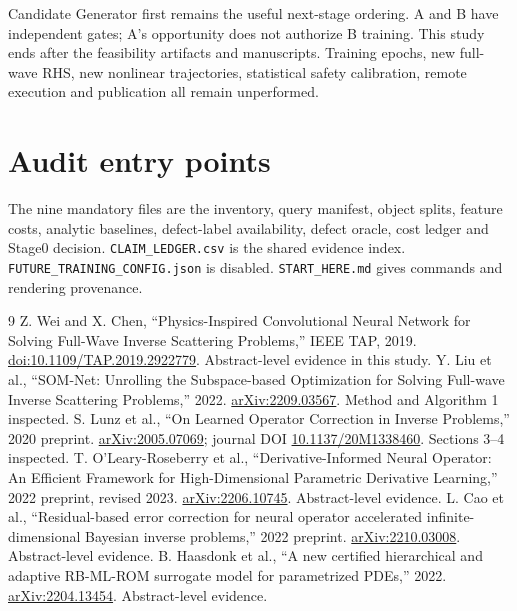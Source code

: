 \documentclass[11pt,a4paper]{article}
\newcommand{\code}[1]{\texttt{#1}}
\begin{document}
Candidate Generator first remains the useful next-stage ordering. A and B have independent gates; A's opportunity does not authorize B training. This study ends after the feasibility artifacts and manuscripts. Training epochs, new full-wave RHS, new nonlinear trajectories, statistical safety calibration, remote execution and publication all remain unperformed.
\appendix\section{Audit entry points}
The nine mandatory files are the inventory, query manifest, object splits, feature costs, analytic baselines, defect-label availability, defect oracle, cost ledger and Stage0 decision. \code{CLAIM\_LEDGER.csv} is the shared evidence index. \code{FUTURE\_TRAINING\_CONFIG.json} is disabled. \code{START\_HERE.md} gives commands and rendering provenance.

\begin{thebibliography}{9}
 Z. Wei and X. Chen, ``Physics-Inspired Convolutional Neural Network for Solving Full-Wave Inverse Scattering Problems,'' IEEE TAP, 2019. \href{https://doi.org/10.1109/TAP.2019.2922779}{doi:10.1109/TAP.2019.2922779}. Abstract-level evidence in this study.
 Y. Liu et al., ``SOM-Net: Unrolling the Subspace-based Optimization for Solving Full-wave Inverse Scattering Problems,'' 2022. \href{https://arxiv.org/abs/2209.03567}{arXiv:2209.03567}. Method and Algorithm 1 inspected.
 S. Lunz et al., ``On Learned Operator Correction in Inverse Problems,'' 2020 preprint. \href{https://arxiv.org/abs/2005.07069}{arXiv:2005.07069}; journal DOI \href{https://doi.org/10.1137/20M1338460}{10.1137/20M1338460}. Sections 3--4 inspected.
 T. O'Leary-Roseberry et al., ``Derivative-Informed Neural Operator: An Efficient Framework for High-Dimensional Parametric Derivative Learning,'' 2022 preprint, revised 2023. \href{https://arxiv.org/abs/2206.10745}{arXiv:2206.10745}. Abstract-level evidence.
 L. Cao et al., ``Residual-based error correction for neural operator accelerated infinite-dimensional Bayesian inverse problems,'' 2022 preprint. \href{https://arxiv.org/abs/2210.03008}{arXiv:2210.03008}. Abstract-level evidence.
 B. Haasdonk et al., ``A new certified hierarchical and adaptive RB-ML-ROM surrogate model for parametrized PDEs,'' 2022. \href{https://arxiv.org/abs/2204.13454}{arXiv:2204.13454}. Abstract-level evidence.
\end{thebibliography}
\end{document}
